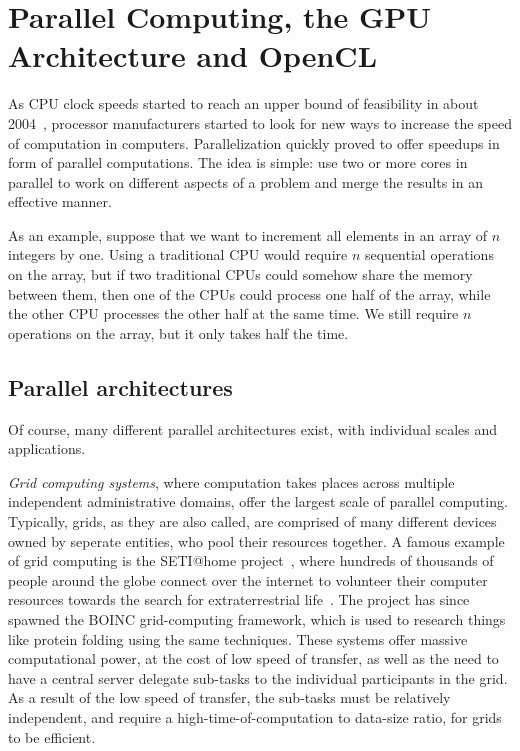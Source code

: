 \section{Parallel Computing, the GPU Architecture and OpenCL}

As CPU clock speeds started to reach an upper bound of feasibility in
about 2004~\cite{clockspeed}, processor manufacturers started to look
for new ways to increase the speed of computation in
computers. Parallelization quickly proved to offer speedups in form of
parallel computations. The idea is simple: use two or more cores in
parallel to work on different aspects of a problem and merge the
results in an effective manner.

As an example, suppose that we want to increment all elements in an
array of $n$ integers by one. Using a traditional CPU would require
$n$ sequential operations on the array, but if two traditional CPUs
could somehow share the memory between them, then one of the CPUs
could process one half of the array, while the other CPU processes the
other half at the same time. We still require $n$ operations on the
array, but it only takes half the time.

\subsection{Parallel architectures}

Of course, many different parallel architectures exist, with
individual scales and applications.

\emph{Grid computing systems}, where computation takes places across
multiple independent administrative domains, offer the largest scale
of parallel computing. Typically, grids, as they are also called, are
comprised of many different devices owned by seperate entities, who
pool their resources together. A famous example of grid computing is
the SETI@home project~\cite{seti}, where hundreds of thousands of
people around the globe connect over the internet to volunteer their
computer resources towards the search for extraterrestrial
life~\cite{seti-number}. The project has since spawned the BOINC
grid-computing framework, which is used to research things like
protein folding \cite{boinc-other} using the same techniques. These
systems offer massive computational power, at the cost of low speed of
transfer, as well as the need to have a central server delegate
sub-tasks to the individual participants in the grid. As a result of
the low speed of transfer, the sub-tasks must be relatively
independent, and require a high-time-of-computation to data-size
ratio, for grids to be efficient.

